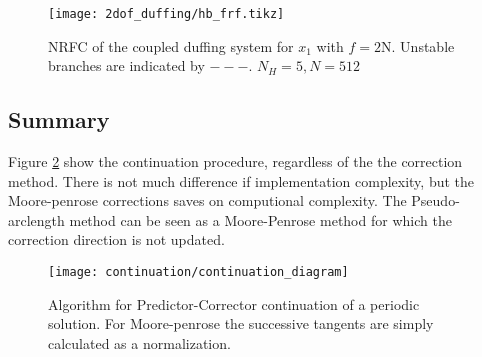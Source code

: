 \begin{figure}[!ht]
  \centering
  \texttt{[image: 2dof\_duffing/hb\_frf.tikz]}
  \caption{NRFC of the coupled duffing system for $x_1$ with $f=2$N. Unstable
    branches are indicated by $- - -$. $N_H = 5, N = 512$}
  \label{fig:hb_frf_2dof}
 \end{figure}

\subsection{Summary}
\label{sec:cont_summary}

Figure \ref{fig:cont_algo} show the continuation procedure, regardless of the
the correction method. There is not much difference if implementation
complexity, but the Moore-penrose corrections saves on computional complexity.
The Pseudo-arclength method can be seen as a Moore-Penrose method for which the
correction direction is not updated.

\begin{figure}[!ht]
  \centering
  \texttt{[image: continuation/continuation\_diagram]}
  \caption{Algorithm for Predictor-Corrector continuation of a periodic
    solution. For Moore-penrose the successive tangents are simply calculated as
  a normalization.}
  \label{fig:cont_algo}
\end{figure}



